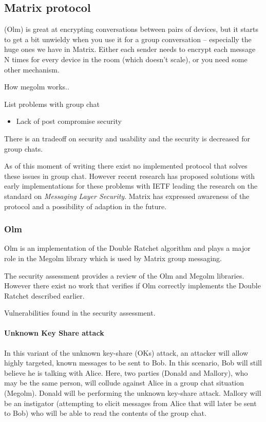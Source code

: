 \subsection{Matrix protocol}

(Olm) is great at encrypting conversations between pairs of devices, but it starts to get a bit unwieldy when you use it for a group conversation – especially the huge ones we have in Matrix.  Either each sender needs to encrypt each message N times for every device in the room (which doesn’t scale), or you need some other mechanism.

How megolm works..




List problems with group chat 

\begin{itemize}
	\item Lack of post compromise security
\end{itemize}

There is an tradeoff on security and usability and the security is decreased for group chats. %

As of this moment of writing there exist no implemented protocol that solves these issues in group chat. However recent research has proposed solutions with early implementations for these problems with IETF leading the research on the standard on \emph{Messaging Layer Security}. Matrix has expressed awareness of the protocol and a possibility of adaption in the future.

\subsubsection{Olm}
Olm is an implementation of the Double Ratchet algorithm and plays a major role in the Megolm library which is used by Matrix group messaging. 

The security assessment provides a review of the Olm and Megolm libraries. However there exist no work that verifies if Olm correctly implements the Double Ratchet described earlier.

Vulnerabilities found in the security assessment. 

\paragraph{Unknown Key Share attack}

In this variant of the unknown key-share (OKs) attack, an attacker will allow highly targeted, known messages to be sent to Bob. In this scenario, Bob will still believe he is talking with Alice. Here, two parties (Donald and Mallory), who may be the same person, will collude against Alice in a group chat situation (Megolm). Donald will be performing the unknown key-share attack. Mallory will be an instigator (attempting to elicit messages from Alice that will later be sent to Bob) who will be able to read the contents of the group chat.

